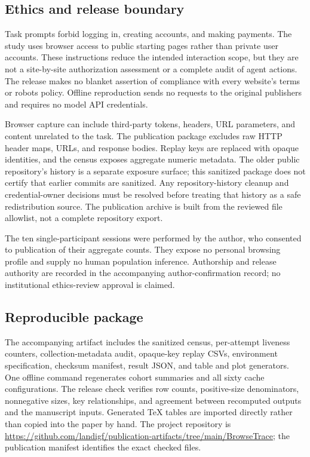 \documentclass[10pt,sigconf,nonacm]{acmart}
\newcommand{\artifacturl}{\url{https://github.com/landigf/publication-artifacts/tree/main/BrowseTrace}}
\begin{document}
\subsection{Ethics and release boundary}
Task prompts forbid logging in, creating accounts, and making payments. The study uses browser access to public starting pages rather than private user accounts. These instructions reduce the intended interaction scope, but they are not a site-by-site authorization assessment or a complete audit of agent actions. The release makes no blanket assertion of compliance with every website's terms or robots policy. Offline reproduction sends no requests to the original publishers and requires no model API credentials.

Browser capture can include third-party tokens, headers, URL parameters, and content unrelated to the task. The publication package excludes raw HTTP header maps, URLs, and response bodies. Replay keys are replaced with opaque identities, and the census exposes aggregate numeric metadata. The older public repository's history is a separate exposure surface; this sanitized package does not certify that earlier commits are sanitized. Any repository-history cleanup and credential-owner decisions must be resolved before treating that history as a safe redistribution source. The publication archive is built from the reviewed file allowlist, not a complete repository export.

The ten single-participant sessions were performed by the author, who consented to publication of their aggregate counts. They expose no personal browsing profile and supply no human population inference. Authorship and release authority are recorded in the accompanying author-confirmation record; no institutional ethics-review approval is claimed.

\subsection{Reproducible package}
The accompanying artifact includes the sanitized census, per-attempt liveness counters, collection-metadata audit, opaque-key replay CSVs, environment specification, checksum manifest, result JSON, and table and plot generators. One offline command regenerates cohort summaries and all sixty cache configurations. The release check verifies row counts, positive-size denominators, nonnegative sizes, key relationships, and agreement between recomputed outputs and the manuscript inputs. Generated TeX tables are imported directly rather than copied into the paper by hand. The project repository is \artifacturl; the publication manifest identifies the exact checked files.
\end{document}

